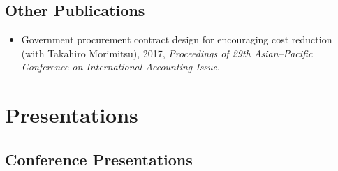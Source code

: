 \documentclass[letterpaper,11pt]{article}
\begin{document}
\subsection*{Other Publications}

\begin{itemize}
	\item Government procurement contract design for encouraging cost reduction (with Takahiro Morimitsu), 2017, \textit{Proceedings of 29th Asian--Pacific Conference on International Accounting Issue}.
\end{itemize}

\section*{Presentations}
\subsection*{Conference Presentations}
\end{document}
